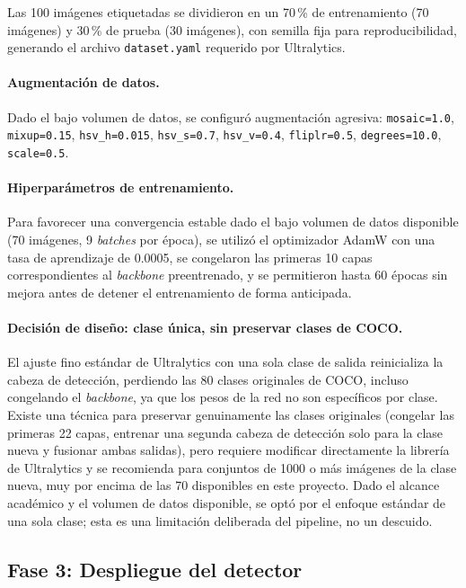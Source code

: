 \documentclass[11pt]{article}
\begin{document}
Las 100 imágenes etiquetadas se dividieron en un 70\,\% de entrenamiento (70 imágenes) y 30\,\%
de prueba (30 imágenes), con semilla fija para reproducibilidad, generando el archivo
\texttt{dataset.yaml} requerido por Ultralytics.

\paragraph{Augmentación de datos.} Dado el bajo volumen de datos, se configuró augmentación
agresiva: \texttt{mosaic=1.0}, \texttt{mixup=0.15}, \texttt{hsv\_h=0.015}, \texttt{hsv\_s=0.7},
\texttt{hsv\_v=0.4}, \texttt{fliplr=0.5}, \texttt{degrees=10.0}, \texttt{scale=0.5}.

\paragraph{Hiperparámetros de entrenamiento.} Para favorecer una convergencia estable dado el
bajo volumen de datos disponible (70 imágenes, 9 \textit{batches} por época), se utilizó el
optimizador AdamW con una tasa de aprendizaje de 0.0005, se congelaron las primeras 10 capas
correspondientes al \textit{backbone} preentrenado, y se permitieron hasta 60 épocas sin mejora
antes de detener el entrenamiento de forma anticipada.

\paragraph{Decisión de diseño: clase única, sin preservar clases de COCO.} El ajuste fino
estándar de Ultralytics con una sola clase de salida reinicializa la cabeza de detección,
perdiendo las 80 clases originales de COCO, incluso congelando el \textit{backbone}, ya que los
pesos de la red no son específicos por clase. Existe una técnica para preservar genuinamente las
clases originales (congelar las primeras 22 capas, entrenar una segunda cabeza de detección solo
para la clase nueva y fusionar ambas salidas), pero requiere modificar directamente la librería
de Ultralytics y se recomienda para conjuntos de 1000 o más imágenes de la clase nueva, muy por
encima de las 70 disponibles en este proyecto. Dado el alcance académico y el volumen de datos
disponible, se optó por el enfoque estándar de una sola clase; esta es una limitación deliberada
del pipeline, no un descuido.

\subsection{Fase 3: Despliegue del detector}
\end{document}
